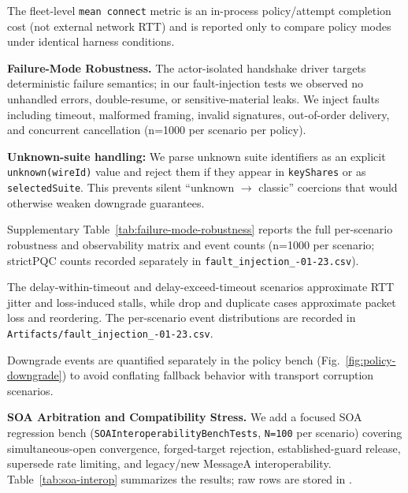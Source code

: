 \documentclass[10pt,journal,compsoc]{IEEEtran}
\newcommand{\artifactdate}{2026-01-23}
\begin{document}
The fleet-level \texttt{mean connect} metric is an in-process
policy/attempt completion cost (not external network RTT) and is reported
only to compare policy modes under identical harness conditions.

\textbf{Failure-Mode Robustness.}
The actor-isolated handshake driver targets deterministic failure semantics; in our fault-injection tests we observed no unhandled errors, double-resume, or sensitive-material leaks. We inject faults including timeout, malformed framing, invalid signatures, out-of-order delivery, and concurrent cancellation (n=1000 per scenario per policy).

\textbf{Unknown-suite handling:} We parse unknown suite identifiers as an
explicit \texttt{unknown(wireId)} value and reject them if they appear in
\texttt{keyShares} or as \texttt{selectedSuite}. This prevents silent
``unknown $\rightarrow$ classic'' coercions that would otherwise weaken
downgrade guarantees.

Supplementary Table~\ref{tab:failure-mode-robustness} reports the full
per-scenario robustness and observability matrix and event counts (n=1000
per scenario; strictPQC counts recorded separately in
\texttt{fault\_injection\_\allowbreak \artifactdate.csv}).

The delay-within-timeout and delay-exceed-timeout scenarios approximate
RTT jitter and loss-induced stalls, while drop and duplicate cases
approximate packet loss and reordering. The per-scenario event
distributions are recorded in \texttt{Artifacts/\allowbreak fault\_injection\_\allowbreak \artifactdate.csv}.

Downgrade events are quantified separately in the policy bench (Fig.~\ref{fig:policy-downgrade})
to avoid conflating fallback behavior with transport corruption
scenarios.

\textbf{SOA Arbitration and Compatibility Stress.}
We add a focused SOA regression bench (\texttt{SOAInteroperability\allowbreak BenchTests},
\texttt{N=100} per scenario) covering simultaneous-open convergence,
forged-target rejection, established-guard release, supersede rate
limiting, and legacy/new MessageA interoperability.
Table~\ref{tab:soa-interop} summarizes the results; raw rows are stored
in .
\end{document}
